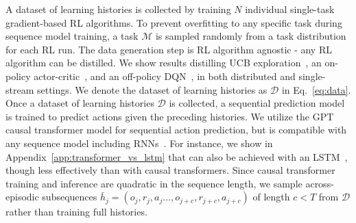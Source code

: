  A dataset of learning histories is collected by training $N$ individual single-task gradient-based RL algorithms. To prevent overfitting to any specific task during sequence model training, a task $\mathcal{M}$ is sampled randomly from a task distribution for each RL run. The data generation step is RL algorithm agnostic - any RL algorithm can be distilled. We show results distilling UCB exploration~\citep{lai86ucb}, an on-policy actor-critic~\citep{mnih16a3c}, and an off-policy DQN~\citep{mnih2013dqn}, in both distributed and single-stream settings. We denote the dataset of learning histories as $\mathcal D$ in Eq.~\ref{eq:data}.
%
 Once a dataset of learning histories $\mathcal D $ is collected, a sequential prediction model is trained to predict actions given the preceding histories. We utilize the GPT~\citep{radford2018improving} causal transformer model for sequential action prediction, but \name is compatible with any sequence model including RNNs~\citep{williams1989learning}. For instance, we show in Appendix~\ref{app:transformer_vs_lstm} that \name can also be achieved with an LSTM~\citep{schm97lstm}, though less effectively than \name with causal transformers. Since causal transformer training and inference are quadratic in the sequence length, we sample across-episodic subsequences $\bar h_j = \left( o_{j}, r_{j}, a_{j} \ldots, o_{j+c}, r_{j+c}, a_{j+c} \right)$ of length $c<T$ from $\mathcal D$ rather than training full histories. 
